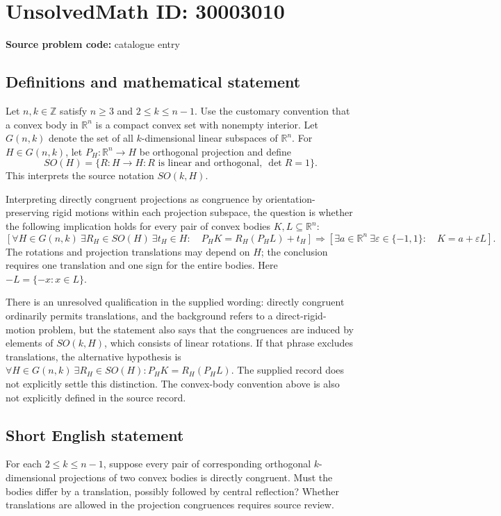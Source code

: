 \documentclass[11pt]{article}
\newcommand{\Z}{\mathbb{Z}}
\newcommand{\R}{\mathbb{R}}
\begin{document}
\section*{UnsolvedMath ID: 30003010}
\textbf{Source problem code:} catalogue entry
\subsection{Definitions and mathematical statement}
Let \(n,k\in\Z\) satisfy \(n\geq3\) and \(2\leq k\leq n-1\). Use the customary convention that a convex body in \(\R^n\) is a compact convex set with nonempty interior. Let \(G(n,k)\) denote the set of all \(k\)-dimensional linear subspaces of \(\R^n\). For \(H\in G(n,k)\), let \(P_H:\R^n\to H\) be orthogonal projection and define
\[
SO(H)=\{R:H\to H: R\text{ is linear and orthogonal},\ \det R=1\}.
\]
This interprets the source notation \(SO(k,H)\).

Interpreting directly congruent projections as congruence by orientation-preserving rigid motions within each projection subspace, the question is whether the following implication holds for every pair of convex bodies \(K,L\subseteq\R^n\):
\[
\left[\forall H\in G(n,k)\ \exists R_H\in SO(H)\ \exists t_H\in H:\quad P_HK=R_H(P_HL)+t_H\right]
\Longrightarrow
\left[\exists a\in\R^n\ \exists\varepsilon\in\{-1,1\}:\quad K=a+\varepsilon L\right].
\]
The rotations and projection translations may depend on \(H\); the conclusion requires one translation and one sign for the entire bodies. Here \(-L=\{-x:x\in L\}\).

There is an unresolved qualification in the supplied wording: directly congruent ordinarily permits translations, and the background refers to a direct-rigid-motion problem, but the statement also says that the congruences are induced by elements of \(SO(k,H)\), which consists of linear rotations. If that phrase excludes translations, the alternative hypothesis is \(\forall H\in G(n,k)\ \exists R_H\in SO(H):P_HK=R_H(P_HL)\). The supplied record does not explicitly settle this distinction. The convex-body convention above is also not explicitly defined in the source record.
\subsection{Short English statement}
For each \(2\leq k\leq n-1\), suppose every pair of corresponding orthogonal \(k\)-dimensional projections of two convex bodies is directly congruent. Must the bodies differ by a translation, possibly followed by central reflection? Whether translations are allowed in the projection congruences requires source review.
\end{document}
